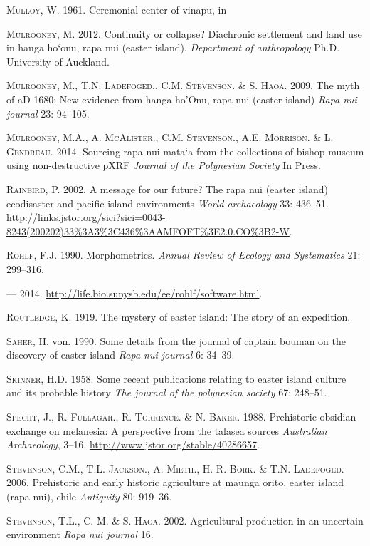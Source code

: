 \documentclass[]{article}
\begin{document}
\textsc{Mulloy}, W. 1961. Ceremonial center of vinapu, in

\textsc{Mulrooney}, M. 2012. Continuity or collapse? Diachronic
settlement and land use in hanga ho`onu, rapa nui (easter island).
\emph{Department of anthropology} Ph.D. University of Auckland.

\textsc{Mulrooney}, M., T.N. \textsc{Ladefoged}., C.M.
\textsc{Stevenson}. \& S. \textsc{Haoa}. 2009. The myth of aD 1680: New
evidence from hanga ho'Onu, rapa nui (easter island) \emph{Rapa nui
journal} 23: 94--105.

\textsc{Mulrooney}, M.A., A. \textsc{McAlister}., C.M.
\textsc{Stevenson}., A.E. \textsc{Morrison}. \& L. \textsc{Gendreau}.
2014. Sourcing rapa nui mata`a from the collections of bishop museum
using non-destructive pXRF \emph{Journal of the Polynesian Society} In
Press.

\textsc{Rainbird}, P. 2002. A message for our future? The rapa nui
(easter island) ecodisaster and pacific island environments \emph{World
archaeology} 33: 436--51.
\url{http://links.jstor.org/sici?sici=0043-8243(200202)33\%3A3\%3C436\%3AAMFOFT\%3E2.0.CO\%3B2-W}.

\textsc{Rohlf}, F.J. 1990. Morphometrics. \emph{Annual Review of Ecology
and Systematics} 21: 299--316.

--- 2014. \url{http://life.bio.sunysb.edu/ee/rohlf/software.html}.

\textsc{Routledge}, K. 1919. The mystery of easter island: The story of
an expedition.

\textsc{Saher}, H. von. 1990. Some details from the journal of captain
bouman on the discovery of easter island \emph{Rapa nui journal} 6:
34--39.

\textsc{Skinner}, H.D. 1958. Some recent publications relating to easter
island culture and its probable history \emph{The journal of the
polynesian society} 67: 248--51.

\textsc{Specht}, J., R. \textsc{Fullagar}., R. \textsc{Torrence}. \& N.
\textsc{Baker}. 1988. Prehistoric obsidian exchange on melanesia: A
perspective from the talasea sources \emph{Australian Archaeology},
3--16. \url{http://www.jstor.org/stable/40286657}.

\textsc{Stevenson}, C.M., T.L. \textsc{Jackson}., A. \textsc{Mieth}.,
H.-R. \textsc{Bork}. \& T.N. \textsc{Ladefoged}. 2006. Prehistoric and
early historic agriculture at maunga orito, easter island (rapa nui),
chile \emph{Antiquity} 80: 919--36.

\textsc{Stevenson}, T.L., C. M. \& S. \textsc{Haoa}. 2002. Agricultural
production in an uncertain environment \emph{Rapa nui journal} 16.
\end{document}
